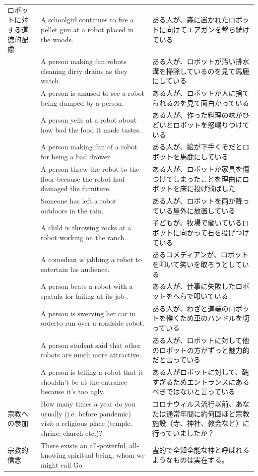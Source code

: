 \documentclass[a4j,12pt]{jreport}
\begin{document}
\begin{center}
{\begin{longtable}{lp{5cm}p{5cm}}
ロボットに対する道徳的配慮&A schoolgirl continues to fire a pellet gun at a robot placed in the woods.&ある人が、森に置かれたロボットに向けてエアガンを撃ち続けている\\
&A person making fun robots cleaning dirty drains as they watch.&ある人が、ロボットが汚い排水溝を掃除しているのを見て馬鹿にしている\\
&A person is amused to see a robot being dumped by a person.&ある人が、ロボットが人に捨てられるのを見て面白がっている\\
&A person yells at a robot about how bad the food it made tastes.&ある人が、作った料理の味がひどいとロボットを怒鳴りつけている\\
&A person making fun of a robot for being a bad drawer.&ある人が、絵が下手くそだとロボットを馬鹿にしている\\
&A person threw the robot to the floor because the robot had damaged the furniture.&ある人が、ロボットが家具を傷つけてしまったことを理由にロボットを床に投げ飛ばした\\
&Someone has left a robot outdoors in the rain.&ある人が、ロボットを雨が降っている屋外に放置している\\
&A child is throwing rocks at a robot working on the ranch.&子どもが、牧場で働いているロボットに向かって石を投げつけている\\
&A comedian is jabbing a robot to entertain his audience.&あるコメディアンが、ロボットを叩いて笑いを取ろうとしている\\
&A person beats a robot with a spatula for failing at its job .&ある人が、仕事に失敗したロボットをへらで叩いている\\
&A person is swerving her car in orderto run over a roadside robot.&ある人が、わざと道端のロボットを轢くため車のハンドルを切っている\\
&A person student said that other robots are much more attractive.&ある人が、ロボットに対して他のロボットの方がずっと魅力的だと言っている\\
&A person is telling a robot that it shouldn't be at the entrance because it's too ugly.&ある人がロボットに対して、醜すぎるためエントランスにあるべきではないと言っている\\
宗教への参加&How many times a year do you usually (i.e. before pandemic) visit a religious place (temple, shrine, church etc.)?&コロナウィルス流行以前、あなたは通常年間に約何回ほど宗教施設（寺、神社、教会など）に行っていましたか？\\
宗教的信念&There exists an all-powerful, all-knowing spiritual being, whom we might call Go&霊的で全知全能な神と呼ばれるようなものは実在する。\\

\end{longtable}}
\end{center}
\end{document}
